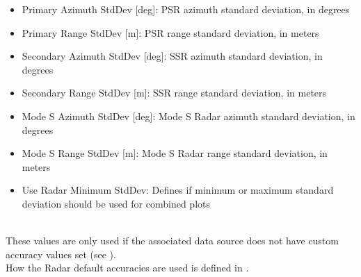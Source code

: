 \begin{itemize}
 \item Primary Azimuth StdDev [deg]: PSR azimuth standard deviation, in degrees
 \item Primary Range StdDev [m]: PSR range standard deviation, in meters
 \item Secondary Azimuth StdDev [deg]: SSR azimuth standard deviation, in degrees
 \item Secondary Range StdDev [m]: SSR range standard deviation, in meters
 \item Mode S Azimuth StdDev [deg]: Mode S Radar azimuth standard deviation, in degrees
 \item Mode S Range StdDev [m]: Mode S Radar range standard deviation, in meters
 \item Use Radar Minimum StdDev: Defines if minimum or maximum standard deviation should be used for combined plots
\end{itemize}
\ \\

These values are only used if the associated data source does not have custom accuracy values set (see ). \\

How the Radar default accuracies are used is defined in .


